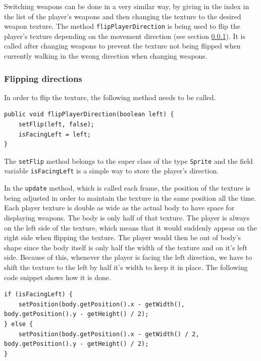 \documentclass[12p]{article}
\begin{document}
Switching weapons can be done in a very similar way, by giving in the index in the list of the player's weapons and then changing the texture to the desired weapon texture. The method \texttt{flipPlayerDirection} is being used to flip the player's texture depending on the movement direction (see section \ref{DocPlayerFlipping}). It is called after changing weapons to prevent the texture not being flipped when currently walking in the wrong direction when changing weapons.

\newpage
\subsubsection{Flipping directions} \label{DocPlayerFlipping}

In order to flip the texture, the following method needs to be called.

\begin{verbatim}
public void flipPlayerDirection(boolean left) {
    setFlip(left, false);
    isFacingLeft = left;
}
\end{verbatim}

The \texttt{setFlip} method belongs to the super class of the type \texttt{Sprite} and the field variable \texttt{isFacingLeft} is a simple way to store the player's direction.

In the \texttt{update} method, which is called each frame, the position of the texture is being adjusted in order to maintain the texture in the same position all the time. Each player texture is double as wide as the actual body to have space for displaying weapons. The body is only half of that texture. The player is always on the left side of the texture, which means that it would suddenly appear on the right side when flipping the texture. The player would then be out of body's shape since the body itself is only half the width of the texture and on it's left side. Because of this, whenever the player is facing the left direction, we have to shift the texture to the left by half it's width to keep it in place. The following code snippet shows how it is done.

\begin{verbatim}
if (isFacingLeft) {
    setPosition(body.getPosition().x - getWidth(), body.getPosition().y - getHeight() / 2);
} else {
    setPosition(body.getPosition().x - getWidth() / 2, body.getPosition().y - getHeight() / 2);
}
\end{verbatim}
\end{document}
